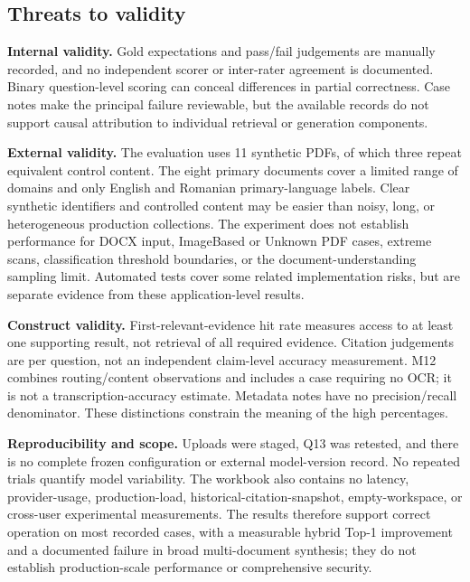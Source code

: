 \subsection{Threats to validity}

\textbf{Internal validity.} Gold expectations and pass/fail judgements are manually recorded, and no independent scorer or inter-rater agreement is documented. Binary question-level scoring can conceal differences in partial correctness. Case notes make the principal failure reviewable, but the available records do not support causal attribution to individual retrieval or generation components.

\textbf{External validity.} The evaluation uses 11 synthetic PDFs, of which three repeat equivalent control content. The eight primary documents cover a limited range of domains and only English and Romanian primary-language labels. Clear synthetic identifiers and controlled content may be easier than noisy, long, or heterogeneous production collections. The experiment does not establish performance for DOCX input, ImageBased or Unknown PDF cases, extreme scans, classification threshold boundaries, or the document-understanding sampling limit. Automated tests cover some related implementation risks, but are separate evidence from these application-level results.

\textbf{Construct validity.} First-relevant-evidence hit rate measures access to at least one supporting result, not retrieval of all required evidence. Citation judgements are per question, not an independent claim-level accuracy measurement. M12 combines routing/content observations and includes a case requiring no OCR; it is not a transcription-accuracy estimate. Metadata notes have no precision/recall denominator. These distinctions constrain the meaning of the high percentages.

\textbf{Reproducibility and scope.} Uploads were staged, Q13 was retested, and there is no complete frozen configuration or external model-version record. No repeated trials quantify model variability. The workbook also contains no latency, provider-usage, production-load, historical-citation-snapshot, empty-workspace, or cross-user experimental measurements. The results therefore support correct operation on most recorded cases, with a measurable hybrid Top-1 improvement and a documented failure in broad multi-document synthesis; they do not establish production-scale performance or comprehensive security.
